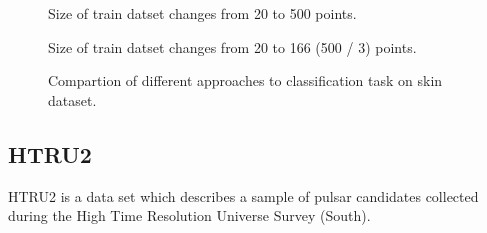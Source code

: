\documentclass[a4paper]{article}
\begin{document}
\begin{figure}[h]
\begin{minipage}[c]{0.49\linewidth}
 Size of train datset changes from 20 to 500 points.
\end{minipage}
\vfill
\begin{minipage}[c]{0.49\linewidth}
 Size of train datset changes from 20 to 166 (500 / 3) points.
\end{minipage}
\caption{Compartion of different approaches to classification task on skin dataset.}
\label{Skinacc}
\end{figure}

\clearpage
\subsection{HTRU2}

HTRU2 is a data set which describes a sample of pulsar candidates collected during the High Time Resolution Universe Survey (South).
\\
\end{document}
